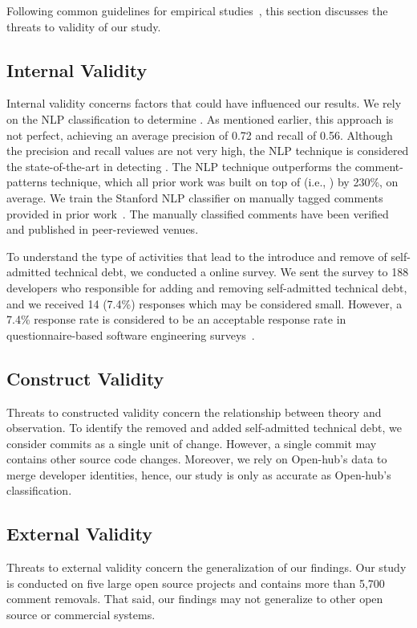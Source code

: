 Following common guidelines for empirical studies~\cite{yin2013case},  this section discusses the threats to validity of our study.

\subsection{Internal Validity} Internal validity concerns factors that could
have influenced our results. We rely on the NLP classification to determine \SATD. As mentioned earlier, this approach is not perfect, achieving an average precision of 0.72 and recall of 0.56. Although the precision and recall values are not very high, the NLP technique is considered the state-of-the-art in detecting \SATD. The NLP technique outperforms the comment-patterns technique, which all prior work was built on top of (i.e., \cite{Wehaibi2016SANER,Bavota2016MSR,Potdar2014ICSME}) by 230\%, on average. We train the Stanford NLP classifier on manually tagged \SATD comments provided in prior work~\cite{Maldonado2015TSE}. The manually classified comments have been verified and published in peer-reviewed venues. 


To understand the type of activities that lead to the introduce and remove of self-admitted technical debt, we conducted a online survey. We sent the survey to 188 developers who responsible for adding and removing self-admitted technical debt, and we received 14 (7.4\%) responses which may be considered small. However, a 7.4\% response rate is considered to be an acceptable response rate in questionnaire-based software engineering surveys~\cite{singer2008software}.

\subsection{Construct Validity} Threats to constructed validity concern the relationship between theory and observation.
To identify the removed and added self-admitted technical debt, we consider commits as a single unit of change. However, a single commit may contains other source code changes. Moreover, we rely on Open-hub's data to merge developer identities, hence, our study is only as accurate as Open-hub's classification.

\subsection{External Validity} Threats to external validity concern the generalization of our findings. Our study is conducted on five large open source projects and contains more than 5,700 comment removals. That said, our findings may not generalize to other open source or commercial systems.